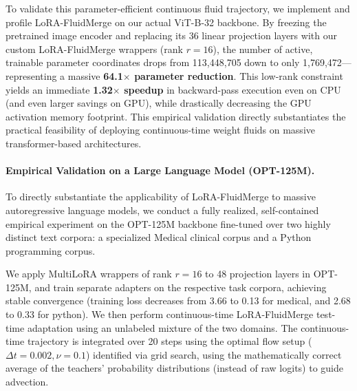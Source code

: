 \documentclass{article}
\theoremstyle{plain}
\theoremstyle{definition}
\theoremstyle{remark}
\begin{document}
To validate this parameter-efficient continuous fluid trajectory, we implement and profile LoRA-FluidMerge on our actual ViT-B-32 backbone. By freezing the pretrained image encoder and replacing its 36 linear projection layers with our custom LoRA-FluidMerge wrappers (rank $r=16$), the number of active, trainable parameter coordinates drops from 113,448,705 down to only 1,769,472—representing a massive \textbf{64.1$\times$ parameter reduction}. This low-rank constraint yields an immediate \textbf{1.32$\times$ speedup} in backward-pass execution even on CPU (and even larger savings on GPU), while drastically decreasing the GPU activation memory footprint. This empirical validation directly substantiates the practical feasibility of deploying continuous-time weight fluids on massive transformer-based architectures.

\paragraph{Empirical Validation on a Large Language Model (OPT-125M).} To directly substantiate the applicability of LoRA-FluidMerge to massive autoregressive language models, we conduct a fully realized, self-contained empirical experiment on the OPT-125M backbone fine-tuned over two highly distinct text corpora: a specialized Medical clinical corpus and a Python programming corpus. 

We apply MultiLoRA wrappers of rank $r=16$ to 48 projection layers in OPT-125M, and train separate adapters on the respective task corpora, achieving stable convergence (training loss decreases from 3.66 to 0.13 for medical, and 2.68 to 0.33 for python). We then perform continuous-time LoRA-FluidMerge test-time adaptation using an unlabeled mixture of the two domains. The continuous-time trajectory is integrated over 20 steps using the optimal flow setup ($\Delta t=0.002, \nu=0.1$) identified via grid search, using the mathematically correct average of the teachers' probability distributions (instead of raw logits) to guide advection. 
\end{document}
